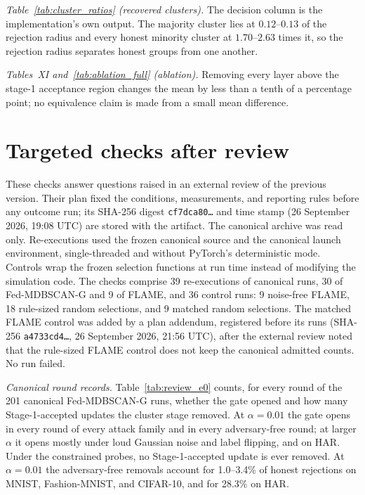 \documentclass[journal]{IEEEtran}
\begin{document}
\emph{Table~\ref{tab:cluster_ratios} (recovered clusters).} The decision column is the implementation's own output. The majority cluster lies at $0.12$--$0.13$ of the rejection radius and every honest minority cluster at $1.70$--$2.63$ times it, so the rejection radius separates honest groups from one another.

\emph{Tables~XI and~\ref{tab:ablation_full} (ablation).} Removing every layer above the stage-1 acceptance region changes the mean by less than a tenth of a percentage point; no equivalence claim is made from a small mean difference.

\section{Targeted checks after review}\label{sec:review}
These checks answer questions raised in an external review of the previous version. Their plan fixed the conditions, measurements, and reporting rules before any outcome run; its SHA-256 digest \texttt{cf7dca80\ldots} and time stamp (26 September 2026, 19:08 UTC) are stored with the artifact. The canonical archive was read only. Re-executions used the frozen canonical source and the canonical launch environment, single-threaded and without PyTorch's deterministic mode. Controls wrap the frozen selection functions at run time instead of modifying the simulation code. The checks comprise 39 re-executions of canonical runs, 30 of Fed-MDBSCAN-G and 9 of FLAME, and 36 control runs: 9 noise-free FLAME, 18 rule-sized random selections, and 9 matched random selections. The matched FLAME control was added by a plan addendum, registered before its runs (SHA-256 \texttt{a4733cd4\ldots}, 26 September 2026, 21:56 UTC), after the external review noted that the rule-sized FLAME control does not keep the canonical admitted counts. No run failed.

\emph{Canonical round records.} Table~\ref{tab:review_e0} counts, for every round of the 201 canonical Fed-MDBSCAN-G runs, whether the gate opened and how many Stage-1-accepted updates the cluster stage removed. At $\alpha=0.01$ the gate opens in every round of every attack family and in every adversary-free round; at larger $\alpha$ it opens mostly under loud Gaussian noise and label flipping, and on HAR. Under the constrained probes, no Stage-1-accepted update is ever removed. At $\alpha=0.01$ the adversary-free removals account for 1.0--3.4\% of honest rejections on MNIST, Fashion-MNIST, and CIFAR-10, and for 28.3\% on HAR.

\end{document}
